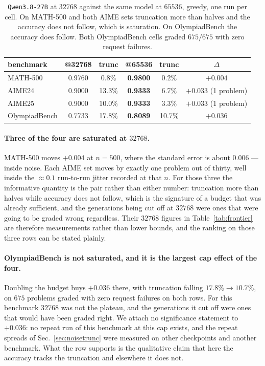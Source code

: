 \begin{table}[t]
\centering\small
\caption{\texttt{Qwen3.8-27B} at $32768$ against the same model at $65536$, greedy, one run
per cell. On MATH-500 and both AIME sets truncation more than halves and the accuracy does
not follow, which is saturation. On OlympiadBench the accuracy does follow. Both
OlympiadBench cells graded $675/675$ with zero request failures.}
\label{tab:capsat}
\begin{tabular}{lccccc}
\toprule
benchmark & @32768 & trunc & @65536 & trunc & $\Delta$ \\
\midrule
MATH-500      & 0.9760 & 0.8\%  & \textbf{0.9800} & 0.2\%  & $+0.004$ \\
AIME24        & 0.9000 & 13.3\% & \textbf{0.9333} & 6.7\%  & $+0.033$ (1 problem) \\
AIME25        & 0.9000 & 10.0\% & \textbf{0.9333} & 3.3\%  & $+0.033$ (1 problem) \\
\midrule
OlympiadBench & 0.7733 & 17.8\% & \textbf{0.8089} & 10.7\% & $+0.036$ \\
\bottomrule
\end{tabular}
\end{table}

\paragraph{Three of the four are saturated at $32768$.} MATH-500 moves $+0.004$ at $n=500$,
where the standard error is about $0.006$ --- inside noise. Each AIME set moves by exactly one
problem out of thirty, well inside the $\approx 0.1$ run-to-run jitter recorded at that $n$.
For those three the informative quantity is the pair rather than either number: truncation
more than halves while accuracy does not follow, which is the signature of a budget that was
already sufficient, and the generations being cut off at $32768$ were ones that were going to
be graded wrong regardless. Their $32768$ figures in Table~\ref{tab:frontier} are therefore
measurements rather than lower bounds, and the ranking on those three rows can be stated
plainly.

\paragraph{OlympiadBench is not saturated, and it is the largest cap effect of the four.}
Doubling the budget buys $+0.036$ there, with truncation falling $17.8\% \to 10.7\%$, on
$675$ problems graded with zero request failures on both rows. For this benchmark $32768$ was
not the plateau, and the generations it cut off were ones that would have been graded right.
We attach no significance statement to $+0.036$: no repeat run of this benchmark at this cap
exists, and the repeat spreads of Sec.~\ref{sec:noisetrunc} were measured on other
checkpoints and another benchmark. What the row supports is the qualitative claim that here
the accuracy tracks the truncation and elsewhere it does not.

